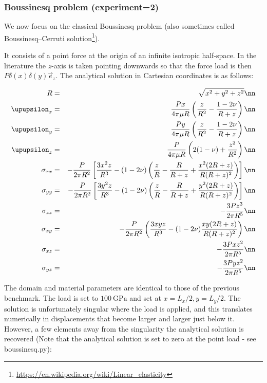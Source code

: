 \subsubsection*{Boussinesq problem (experiment=2)}

We now focus on the classical Boussinesq problem (also sometimes called Boussinesq–Cerruti 
solution\footnote{\url{https://en.wikipedia.org/wiki/Linear_elasticity}}).

It consists of a point force at the origin of an infinite isotropic half-space. In the literature the 
$z$-axis is taken pointing downwards so that the force load is then $P\delta(x)\delta(y) \vec{e}_z$.
The analytical solution in Cartesian coordinates is as follows:

\begin{eqnarray}
R&=&\sqrt{x^2+y^2+z^2} \nn\\
\upupsilon_x &=& \frac{Px}{4\pi \mu R} 
\left(\frac{z}{R^2}-\frac{1-2\nu}{R+z}\right) \nn\\
\upupsilon_y &=& \frac{Py}{4\pi \mu R} 
\left(\frac{z}{R^2}-\frac{1-2\nu}{R+z}\right) \nn\\
\upupsilon_z &=& \frac{P}{4\pi \mu R} 
\left(2(1-\nu)+\frac{z^2}{R^2}\right) \nn\\
\sigma_{xx} &=& -\frac{P}{2\pi R^2}
\left[\frac{3x^2z}{R^3}-(1-2\nu)\left(\frac{z}{R}-\frac{R}{R+z} + \frac{x^2 (2R+z)}{R(R+z)^2}\right)
\right]\nn\\
\sigma_{yy} &=& -\frac{P}{2\pi R^2}
\left[\frac{3y^2z}{R^3}-(1-2\nu)\left(\frac{z}{R}-\frac{R}{R+z} + \frac{y^2 (2R+z)}{R(R+z)^2}\right)
\right]\nn\\
\sigma_{zz} &=& -\frac{3Pz^3}{2\pi R^5} \nn\\
\sigma_{xy} &=& -\frac{P}{2\pi R^2} 
\left(
\frac{3xyz}{R^3} - (1-2\nu) \frac{xy(2R+z)}{R(R+z)^2}
\right) \nn\\
\sigma_{xz} &=& -\frac{3Pxz^2}{2\pi R^5} \nn\\
\sigma_{yz} &=& -\frac{3Pyz^2}{2\pi R^5} \nn
\end{eqnarray}

The domain and material parameters are identical to those of the previous benchmark. The load is 
set to $\SI{100}{\giga\pascal}$ and set at $x=L_x/2,y=L_y/2$.
The solution is unfortunately singular where the load is applied, and this translates numerically in displacements
that become larger and larger just below it. However, a few elements away from the singularity the 
analytical solution is recovered (Note that the analytical solution is set to zero at the point load - 
see {\pythonfile boussinesq.py}):

